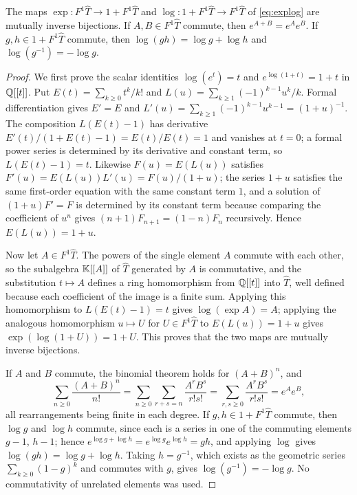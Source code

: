\begin{lemma}\label{lem:explog}
The maps $\exp:F^1\widehat T\to1+F^1\widehat T$ and
$\log:1+F^1\widehat T\to F^1\widehat T$ of \eqref{eq:explog} are mutually
inverse bijections. If $A,B\in F^1\widehat T$ commute, then $e^{A+B}=e^Ae^B$.
If $g,h\in1+F^1\widehat T$ commute, then $\log(gh)=\log g+\log h$ and
$\log(g^{-1})=-\log g$.
\end{lemma}
\begin{proof}
We first prove the scalar identities $\log(e^t)=t$ and $e^{\log(1+t)}=1+t$
in $\mathbb{Q}[[t]]$. Put $E(t)=\sum_{k\geq0}t^k/k!$ and
$L(u)=\sum_{k\geq1}(-1)^{k-1}u^k/k$. Formal differentiation gives $E'=E$ and
$L'(u)=\sum_{k\geq1}(-1)^{k-1}u^{k-1}=(1+u)^{-1}$. The composition
$L(E(t)-1)$ has derivative $E'(t)/(1+E(t)-1)=E(t)/E(t)=1$ and vanishes at
$t=0$; a formal power series is determined by its derivative and constant
term, so $L(E(t)-1)=t$. Likewise $F(u)=E(L(u))$ satisfies
$F'(u)=E(L(u))L'(u)=F(u)/(1+u)$; the series $1+u$ satisfies the same
first-order equation with the same constant term $1$, and a solution of
$(1+u)F'=F$ is determined by its constant term because comparing the
coefficient of $u^n$ gives $(n+1)F_{n+1}=(1-n)F_n$ recursively. Hence
$E(L(u))=1+u$.

Now let $A\in F^1\widehat T$. The powers of the single element $A$ commute
with each other, so the subalgebra $\mathbb{K}[[A]]$ of $\widehat T$ generated by $A$
is commutative, and the substitution $t\mapsto A$ defines a ring homomorphism
from $\mathbb{Q}[[t]]$ into $\widehat T$, well defined because each coefficient of
the image is a finite sum. Applying this homomorphism to $L(E(t)-1)=t$ gives
$\log(\exp A)=A$; applying the analogous homomorphism $u\mapsto U$ for
$U\in F^1\widehat T$ to $E(L(u))=1+u$ gives $\exp(\log(1+U))=1+U$. This
proves that the two maps are mutually inverse bijections.

If $A$ and $B$ commute, the binomial theorem holds for $(A+B)^n$, and
\[
 \sum_{n\geq0}\frac{(A+B)^n}{n!}
 =\sum_{n\geq0}\sum_{r+s=n}\frac{A^rB^s}{r!s!}
 =\sum_{r,s\geq0}\frac{A^rB^s}{r!s!}=e^Ae^B,
\]
all rearrangements being finite in each degree. If $g,h\in1+F^1\widehat T$
commute, then $\log g$ and $\log h$ commute, since each is a series in one
of the commuting elements $g-1$, $h-1$; hence
$e^{\log g+\log h}=e^{\log g}e^{\log h}=gh$, and applying $\log$ gives
$\log(gh)=\log g+\log h$. Taking $h=g^{-1}$, which exists as the geometric
series $\sum_{k\geq0}(1-g)^k$ and commutes with $g$, gives
$\log(g^{-1})=-\log g$. No commutativity of unrelated elements was used.
\end{proof}

